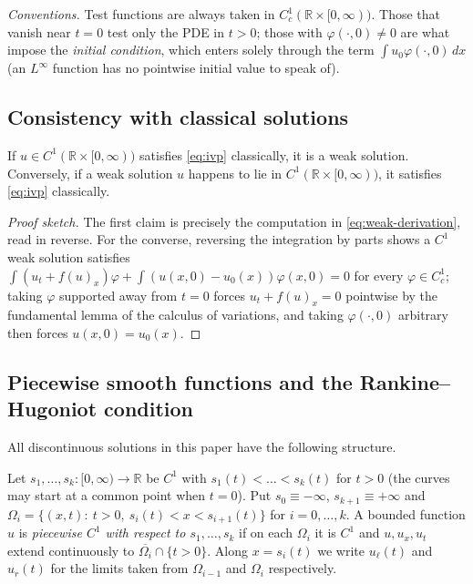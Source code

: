 \noindent\emph{Conventions.} Test functions are always taken in
$C_c^1(\mathbb{R}\times[0,\infty))$. Those that vanish near $t=0$ test only
the PDE in $t>0$; those with $\varphi(\cdot,0)\ne0$ are what impose the
\emph{initial condition}, which enters solely through the term
$\int u_0\varphi(\cdot,0)\,dx$ (an $L^\infty$ function has no pointwise
initial value to speak of).

\subsection{Consistency with classical solutions}
\label{subsec:weak-consistency}

\begin{proposition}[Consistency]
\label{prop:weak-consistency}
If $u \in C^1(\mathbb{R}\times[0,\infty))$ satisfies \eqref{eq:ivp}
classically, it is a weak solution. Conversely, if a weak solution $u$
happens to lie in $C^1(\mathbb{R}\times[0,\infty))$, it satisfies
\eqref{eq:ivp} classically.
\end{proposition}

\begin{proof}[Proof sketch]
The first claim is precisely the computation in
\eqref{eq:weak-derivation}, read in reverse. For the converse, reversing
the integration by parts shows a $C^1$ weak solution satisfies
$\int (u_t+f(u)_x)\varphi + \int (u(x,0)-u_0(x))\varphi(x,0) = 0$ for
every $\varphi\in C_c^1$; taking $\varphi$ supported away from $t=0$
forces $u_t+f(u)_x=0$ pointwise by the fundamental lemma of the calculus
of variations, and taking $\varphi(\cdot,0)$ arbitrary then forces
$u(x,0)=u_0(x)$.
\end{proof}

\subsection{Piecewise smooth functions and the Rankine--Hugoniot condition}
\label{subsec:rankine-hugoniot}

All discontinuous solutions in this paper have the following structure.

\begin{definition}
\label{def:piecewise}
Let $s_1,\dots,s_k:[0,\infty)\to\mathbb{R}$ be $C^1$ with $s_1(t)<\dots<
s_k(t)$ for $t>0$ (the curves may start at a common point when $t=0$).
Put $s_0\equiv-\infty$, $s_{k+1}\equiv+\infty$ and
$\Omega_i=\{(x,t):\ t>0,\ s_i(t)<x<s_{i+1}(t)\}$ for $i=0,\dots,k$. A
bounded function $u$ is \emph{piecewise $C^1$ with respect to
$s_1,\dots,s_k$} if on each $\Omega_i$ it is $C^1$ and $u,u_x,u_t$ extend
continuously to $\overline{\Omega_i}\cap\{t>0\}$. Along $x=s_i(t)$ we
write $u_\ell(t)$ and $u_r(t)$ for the limits taken from $\Omega_{i-1}$
and $\Omega_i$ respectively.
\end{definition}

